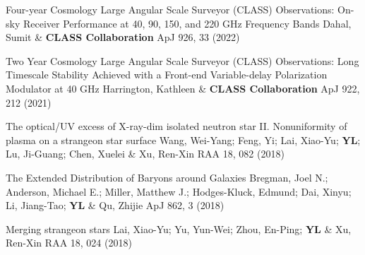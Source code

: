 \begin{etaremune}[topsep=0pt,itemsep=0pt,partopsep=0pt,parsep=0pt]
            {Four-year Cosmology Large Angular Scale Surveyor (CLASS) Observations: On-sky Receiver Performance at 40, 90, 150, and 220 GHz Frequency Bands}
            {Dahal, Sumit \& \textbf{CLASS Collaboration}}
            {ApJ 926, 33 (2022)}
    
            {Two Year Cosmology Large Angular Scale Surveyor (CLASS) Observations: Long Timescale Stability Achieved with a Front-end Variable-delay Polarization Modulator at 40 GHz}
            {Harrington, Kathleen \& \textbf{CLASS Collaboration}}
            {ApJ 922, 212 (2021)}
    
            {The optical/UV excess of X-ray-dim isolated neutron star II. Nonuniformity of plasma on a strangeon star surface}
            {Wang, Wei-Yang; Feng, Yi; Lai, Xiao-Yu; \textbf{YL}; Lu, Ji-Guang; Chen, Xuelei \& Xu, Ren-Xin}
            {RAA 18, 082 (2018)}
    
            {The Extended Distribution of Baryons around Galaxies}
            {Bregman, Joel N.; Anderson, Michael E.; Miller, Matthew J.; Hodges-Kluck, Edmund; Dai, Xinyu; Li, Jiang-Tao; \textbf{YL} \& Qu, Zhijie}
            {ApJ 862, 3 (2018)}
    
            {Merging strangeon stars}
            {Lai, Xiao-Yu; Yu, Yun-Wei; Zhou, En-Ping; \textbf{YL} \& Xu, Ren-Xin}
            {RAA 18, 024 (2018)}
    
\end{etaremune}

